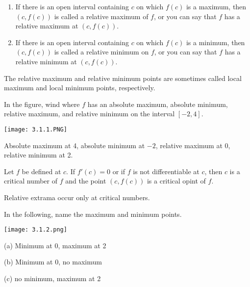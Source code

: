 \documentclass[../bccalc.tex]{subfiles}
\begin{document}
\begin{definition}
    \begin{enumerate}
        \item If there is an open interval containing $c$ on which $f(c)$ is a maximum, then $(c, f(c))$ is called a relative maximum of $f$, or you can say that $f$ has a relative maximum at $(c,f(c))$.
        \item If there is an open interval containing $c$ on which $f(c)$ is a minimum, then $(c,f(c))$ is called a relative minimum on $f$, or you can say that $f$ has a relative minimum at $(c,f(c))$.
    \end{enumerate}

    The relative maximum and relative minimum points are sometimes called local maximum and local minimum points, respectively.
\end{definition}
\pagebreak
\begin{example}
    In the figure, wind where $f$ has an absolute maximum, absolute minimum, relative maximum, and relative minimum on the interval $[-2,4]$.
    \begin{center}
        \texttt{[image: 3.1.1.PNG]}
    \end{center}
    Absolute maximum at 4, absolute minimum at $-2$, relative maximum at 0, relative minimum at 2.
\end{example}

\begin{definition}
    Let $f$ be defined at $c$. If $f'(c)=0$ or if $f$ is not differentiable at $c$, then $c$ is a critical number of $f$ and the point $(c,f(c))$ is a critical opint of $f$.
\end{definition}

\begin{theorem}
    Relative extrama occur only at critical numbers.
\end{theorem}

\begin{example}
    In the following, name the maximum and minimum points.
    \begin{center}
        \texttt{[image: 3.1.2.png]}
    \end{center}

    (a) Minimum at 0, maximum at 2 

    (b) Minimum at 0, no maximum 

    (c) no minimum, maximum at 2
\end{example}
\end{document}
